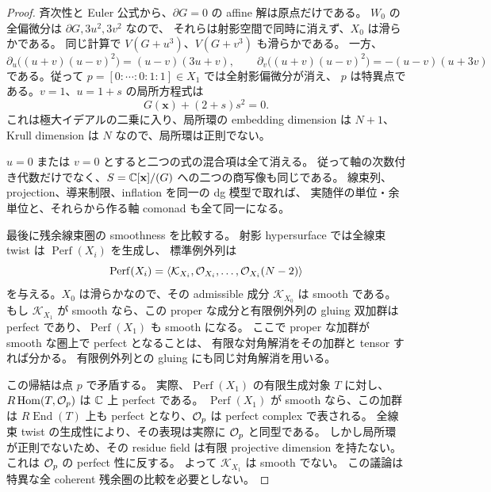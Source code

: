 \begin{proof}
斉次性と Euler 公式から、$\partial G=0$ の affine 解は原点だけである。
$W_0$ の全偏微分は $\partial G,3u^2,3v^2$ なので、
それらは射影空間で同時に消えず、$X_0$ は滑らかである。
同じ計算で $V(G+u^3)$、$V(G+v^3)$ も滑らかである。
一方、
\[
 \partial_u\bigl((u+v)(u-v)^2\bigr)=(u-v)(3u+v),\qquad
 \partial_v\bigl((u+v)(u-v)^2\bigr)=-(u-v)(u+3v)
\]
である。従って $p=[0:\cdots:0:1:1]\in X_1$ では全射影偏微分が消え、
$p$ は特異点である。$v=1$、$u=1+s$ の局所方程式は
\[
                          G(\mathbf x)+(2+s)s^2=0.
\]
これは極大イデアルの二乗に入り、局所環の embedding dimension は $N+1$、
Krull dimension は $N$ なので、局所環は正則でない。

$u=0$ または $v=0$ とすると二つの式の混合項は全て消える。
従って軸の次数付き代数だけでなく、$S=\mathbb C[\mathbf x]/(G)$ への二つの商写像も同じである。
線束列、projection、導来制限、inflation を同一の dg 模型で取れば、
実随伴の単位・余単位と、それらから作る軸 comonad も全て同一になる。

最後に残余線束圏の smoothness を比較する。
射影 hypersurface では全線束 twist は $\operatorname{Perf}(X_i)$ を生成し、
標準例外列は
\[
 \operatorname{Perf}(X_i)
   =\langle\mathcal K_{X_i},\mathcal O_{X_i},\ldots,\mathcal O_{X_i}(N-2)\rangle
\]
を与える。$X_0$ は滑らかなので、その admissible 成分
$\mathcal K_{X_0}$ は smooth である。
もし $\mathcal K_{X_1}$ が smooth なら、この proper な成分と有限例外列の
gluing 双加群は perfect であり、$\operatorname{Perf}(X_1)$ も smooth になる。
ここで proper な加群が smooth な圏上で perfect となることは、
有限な対角解消をその加群と tensor すれば分かる。
有限例外列との gluing にも同じ対角解消を用いる。

この帰結は点 $p$ で矛盾する。
実際、$\operatorname{Perf}(X_1)$ の有限生成対象 $T$ に対し、
$R\operatorname{Hom}(T,\mathcal O_p)$ は $\mathbb C$ 上 perfect である。
$\operatorname{Perf}(X_1)$ が smooth なら、この加群は
$R\operatorname{End}(T)$ 上も perfect となり、$\mathcal O_p$ は perfect complex で表される。
全線束 twist の生成性により、その表現は実際に $\mathcal O_p$ と同型である。
しかし局所環が正則でないため、その residue field は有限 projective dimension を持たない。
これは $\mathcal O_p$ の perfect 性に反する。
よって $\mathcal K_{X_1}$ は smooth でない。
この議論は特異な全 coherent 残余圏の比較を必要としない。
\end{proof}
